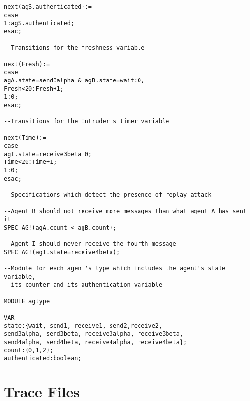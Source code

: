 \begin{appendix}
{\begin{verbatim}
next(agS.authenticated):=
case
1:agS.authenticated;
esac;

--Transitions for the freshness variable

next(Fresh):=
case
agA.state=send3alpha & agB.state=wait:0;
Fresh<20:Fresh+1;
1:0;
esac;

--Transitions for the Intruder's timer variable

next(Time):=
case
agI.state=receive3beta:0;
Time<20:Time+1;
1:0;
esac;

--Specifications which detect the presence of replay attack

--Agent B should not receive more messages than what agent A has sent it
SPEC AG!(agA.count < agB.count);

--Agent I should never receive the fourth message
SPEC AG!(agI.state=receive4beta);

--Module for each agent's type which includes the agent's state variable, 
--its counter and its authentication variable

MODULE agtype

VAR
state:{wait, send1, receive1, send2,receive2, 
send3alpha, send3beta, receive3alpha, receive3beta, 
send4alpha, send4beta, receive4alpha, receive4beta};
count:{0,1,2};
authenticated:boolean;

\end{verbatim}

\chapter{Trace Files}

}
\end{appendix}
